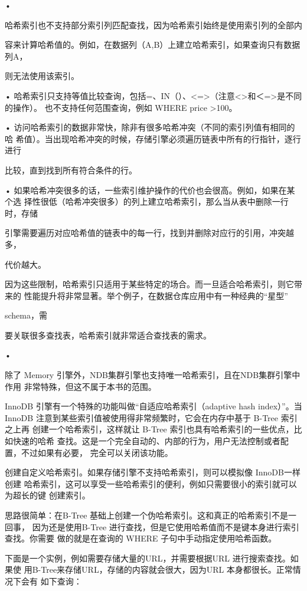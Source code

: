 •

哈希索引也不支持部分索引列匹配查找，因为哈希索引始终是使用索引列的全部内

容来计算哈希值的。例如，在数据列（A,B）上建立哈希索引，如果查询只有数据列A，

则无法使用该索引。

• 哈希索引只支持等值比较查询，包括=、IN（）、<=>（注意<>和＜=>是不同的操作）。
也不支持任何范围查询，例如 WHERE price >100。

• 访问哈希索引的数据非常快，除非有很多哈希冲突（不同的索引列值有相同的哈
希值）。当出现哈希冲突的时候，存储引擎必须遍历链表中所有的行指针，逐行进行

比较，直到找到所有符合条件的行。

• 如果哈希冲突很多的话，一些索引维护操作的代价也会很高。例如，如果在某个选
择性很低（哈希冲突很多）的列上建立哈希索引，那么当从表中删除一行时，存储

引擎需要遍历对应哈希值的链表中的每一行，找到并删除对应行的引用，冲突越多，

代价越大。

因为这些限制，哈希索引只适用于某些特定的场合。而一旦适合哈希索引，则它带来的
性能提升将非常显著。举个例子，在数据仓库应用中有一种经典的“星型”

schema，需

要关联很多查找表，哈希索引就非常适合查找表的需求。

•

除了 Memory 引擎外，NDB集群引擎也支持唯一哈希索引，且在NDB集群引擎中作用
非常特殊，但这不属于本书的范围。

InnoDB 引擎有一个特殊的功能叫做“自适应哈希索引（adaptive hash index）”。当
InnoDB 注意到某些索引值被使用得非常频繁时，它会在内存中基于 B-Tree 索引之上再
创建一个哈希索引，这样就让 B-Tree 索引也具有哈希索引的一些优点，比如快速的哈希
查找。这是一个完全自动的、内部的行为，用户无法控制或者配置，不过如果有必要，
完全可以关闭该功能。

创建自定义哈希索引。如果存储引擎不支持哈希索引，则可以模拟像 InnoDB一样创建
哈希索引，这可以享受一些哈希索引的便利，例如只需要很小的索引就可以为超长的键
创建索引。

思路很简单：在B-Tree 基础上创建一个伪哈希索引。这和真正的哈希索引不是一回事，
因为还是使用B-Tree 进行查找，但是它使用哈希值而不是键本身进行索引查找。你需要
做的就是在查询的 WHERE 子句中手动指定使用哈希函数。

下面是一个实例，例如需要存储大量的URL，并需要根据URL 进行搜索查找。如果使
用B-Tree来存储URL，存储的内容就会很大，因为URL 本身都很长。正常情况下会有
如下查询：

